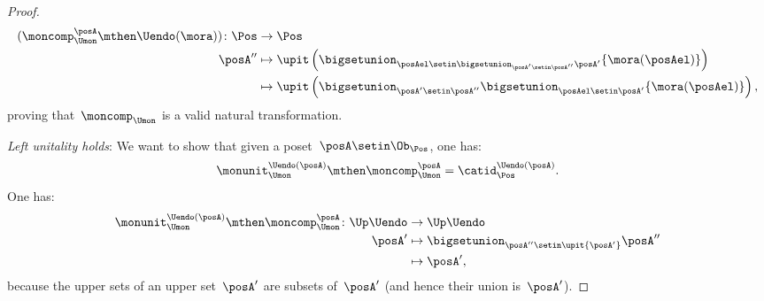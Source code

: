\begin{proof}
    \begin{equation}
        \begin{aligned}
            (\moncomp_{\Umon}^\posA \mthen \Uendo(\mora))
            \colon \Pos & \to \Pos \\
            \posA''     & \mapsto \upit \left( \bigsetunion_{\posAel \setin \bigsetunion_{\posA'\setin \posA''}\posA'} \{ \mora(\posAel)\}\right) \\
                        & \mapsto \upit \left( \bigsetunion_{\posA'\setin \posA''}\bigsetunion_{\posAel \setin \posA'}\{\mora(\posAel)\}\right),
        \end{aligned}
    \end{equation}
    proving that~$\moncomp_{\Umon}$ is a valid natural transformation.

    \emph{Left unitality holds}: We want to show that given a poset~$\posA\setin \Ob_\Pos$, one has:
    \begin{equation}
        \monunit_{\Umon}^{\Uendo(\posA)}\mthen \moncomp_{\Umon}^{\posA}=\catid_{\Pos}^{\Uendo(\posA)}.
    \end{equation}
    One has:
    \begin{equation}
        \begin{aligned}
            \monunit_{\Umon}^{\Uendo(\posA)}\mthen \moncomp_{\Umon}^{\posA}\colon \Up \Uendo & \to \Up \Uendo \\
            \posA'                                                                           & \mapsto \bigsetunion_{\posA''\setin \upit \{ \posA'\}} \posA'' \\
                                                                                             & \mapsto \posA',
        \end{aligned}
    \end{equation}
    because the upper sets of an upper set~$\posA'$ are subsets of~$\posA'$ (and hence their union is~$\posA'$).


\end{proof}

